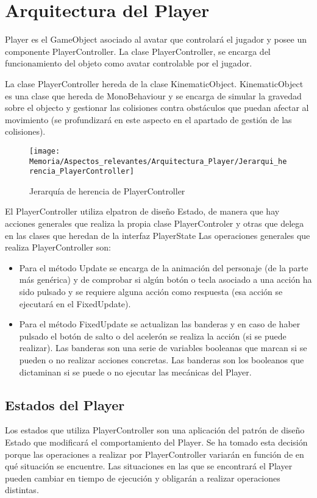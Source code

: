 
\section{Arquitectura del Player}
Player es el GameObject asociado al avatar que controlará el jugador y posee un componente PlayerController. La clase PlayerController, se encarga del funcionamiento del objeto como avatar controlable por el jugador.

La clase PlayerController hereda de la clase KinematicObject. KinematicObject es una clase que hereda de MonoBehaviour y se encarga de simular la gravedad sobre el objecto y gestionar las colisiones contra obstáculos que puedan afectar al movimiento (se profundizará en este aspecto en el apartado de gestión de las colisiones).

\clearpage
\begin{figure}[h]
\centering
\texttt{[image: Memoria/Aspectos\_relevantes/Arquitectura\_Player/Jerarqui\_herencia\_PlayerController]}
\caption{Jerarquía de herencia de PlayerController}
\end{figure}

El PlayerController utiliza elpatron de diseño Estado, de manera que hay acciones generales que realiza la propia clase PlayerControler y otras que delega en las clases que heredan de la interfaz PlayerState
Las operaciones generales que realiza PlayerController son:
\begin{itemize}
\item
Para el método Update se encarga de la animación del personaje (de la parte más genérica) y de comprobar si algún botón o tecla asociado a una acción ha sido pulsado y se requiere alguna acción como respuesta (esa acción se ejecutará en el FixedUpdate).
\item
Para el método FixedUpdate se actualizan las banderas y en caso de haber pulsado el botón de salto o del acelerón se realiza la acción (si se puede realizar). Las banderas son una serie de variables booleanas que marcan si se pueden o no realizar acciones concretas. Las banderas son los booleanos que dictaminan si se puede o no ejecutar las mecánicas del Player.
\end{itemize}

\subsection{Estados del Player}
Los estados que utiliza PlayerController son una aplicación del patrón de diseño Estado que modificará el comportamiento del Player. Se ha tomado esta decisión porque las operaciones a realizar por PlayerController variarán en función de en qué situación se encuentre. Las situaciones en las que se encontrará el Player pueden cambiar en tiempo de ejecución y obligarán a realizar operaciones distintas.

